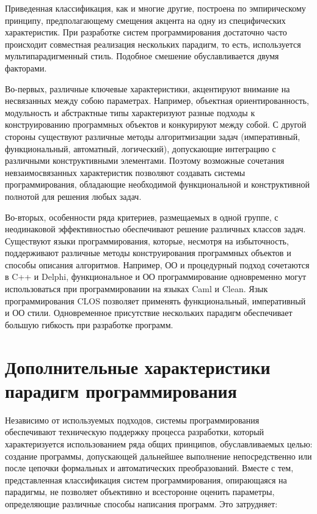 Приведенная классификация, как и многие другие, построена по эмпирическому принципу, предполагающему смещения акцента на одну из специфических характеристик. При разработке систем программирования достаточно часто происходит совместная реализация нескольких парадигм, то есть, используется мультипарадигменный стиль. Подобное смешение обуславливается двумя факторами.

Во-первых, различные ключевые характеристики, акцентируют внимание на несвязанных между собою параметрах. Например, объектная ориентированность, модульность и абстрактные типы характеризуют разные подходы к конструированию программных объектов и конкурируют между собой. С другой стороны существуют различные методы алгоритмизации задач (императивный, функциональный, автоматный, логический), допускающие интеграцию с различными конструктивными элементами. Поэтому возможные сочетания невзаимосвязанных характеристик позволяют создавать системы программирования, обладающие необходимой функциональной и конструктивной полнотой для решения любых задач.

Во-вторых, особенности ряда критериев, размещаемых в одной группе, с неодинаковой эффективностью обеспечивают решение различных классов задач. Существуют языки программирования, которые, несмотря на избыточность, поддерживают различные методы конструирования программных объектов и способы описания алгоритмов. Например, ОО и процедурный подход сочетаются в C++ и Delphi, функциональное и ОО программирование одновременно могут использоваться при программировании на языках Caml и Clean. Язык программирования CLOS позволяет применять функциональный, императивный и ОО стили. Одновременное присутствие нескольких парадигм обеспечивает большую гибкость при разработке программ.

\section{Дополнительные характеристики парадигм программирования}

Независимо от используемых подходов, системы программирования обеспечивают техническую поддержку процесса разработки, который характеризуется использованием ряда общих принципов, обуславливаемых целью: создание программы, допускающей дальнейшее выполнение непосредственно или после цепочки формальных и автоматических преобразований. Вместе с тем, представленная классификация систем программирования, опирающаяся на парадигмы, не позволяет объективно и всесторонне оценить параметры, определяющие различные способы написания программ. Это затрудняет:

